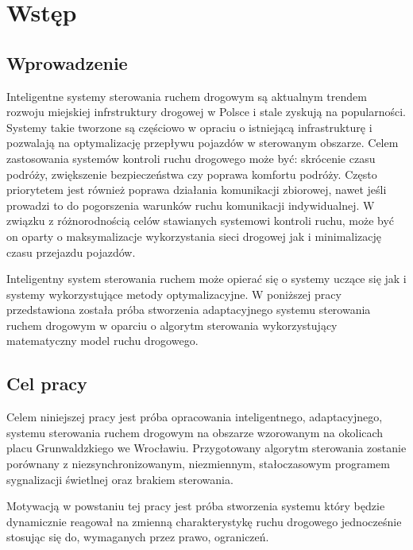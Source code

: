 \chapter{Wstęp}
\section{Wprowadzenie}
Inteligentne systemy sterowania ruchem drogowym są aktualnym trendem rozwoju miejskiej infrstruktury drogowej w Polsce i stale zyskują na popularności.
Systemy takie tworzone są częściowo w opraciu o istniejącą infrastrukturę i pozwalają na optymalizację przepływu pojazdów w sterowanym obszarze.
Celem zastosowania systemów kontroli ruchu drogowego może być: skrócenie czasu podróży, zwiększenie bezpieczeństwa czy poprawa komfortu podróży. Często priorytetem jest również poprawa działania komunikacji zbiorowej, nawet jeśli prowadzi to do pogorszenia warunków ruchu komunikacji indywidualnej.
W związku z różnorodnością celów stawianych systemowi kontroli ruchu, może być on oparty o maksymalizacje wykorzystania sieci drogowej jak i minimalizację czasu przejazdu pojazdów.

Inteligentny system sterowania ruchem może opierać się o systemy uczące się jak i systemy wykorzystujące metody optymalizacyjne. W poniższej pracy przedstawiona została próba stworzenia adaptacyjnego systemu sterowania ruchem drogowym w oparciu o algorytm sterowania wykorzystujący matematyczny model ruchu drogowego.

\section{Cel pracy}
Celem niniejszej pracy jest próba opracowania inteligentnego, adaptacyjnego, systemu sterowania ruchem drogowym na obszarze wzorowanym na okolicach placu Grunwaldzkiego we Wrocławiu. Przygotowany algorytm sterowania zostanie porównany z niezsynchronizowanym, niezmiennym, stałoczasowym programem sygnalizacji świetlnej oraz brakiem sterowania.

Motywacją w powstaniu tej pracy jest próba stworzenia systemu który będzie dynamicznie reagował na zmienną charakterystykę ruchu drogowego jednocześnie stosując się do, wymaganych przez prawo, ograniczeń.